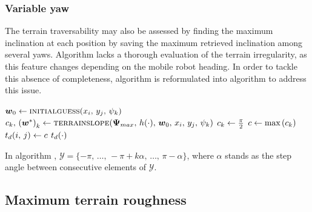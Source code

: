 \subsubsection*{Variable yaw}

The terrain traversability may also be assessed by finding the maximum inclination at each position by saving the maximum retrieved inclination among several yaws. Algorithm  lacks a thorough evaluation of the terrain irregularity, as this feature changes depending on the mobile robot heading. In order to tackle this absence of completeness, algorithm  is reformulated into algorithm  to address this issue.

\begin{algorithm}[H]
	\caption{\footnotesize \textsc{MAPSLOPE}}\label{alg:slopeMinHeightMapVarYaw}
	\centering
	\footnotesize
	\begin{algorithmic}[1]
	 
	\State $\boldsymbol{w}_0 \gets \textsc{initialguess}(x_i, \, y_j, \, \psi_k)$ 
	\State $c_k,\, \left( \boldsymbol{w}^* \right)_k \gets \textsc{terrainslope}(\boldsymbol{\Psi}_{max}, \, h(\cdot), \, \boldsymbol{w}_0, \, x_i, \, y_j, \, \psi_k)$ 
	\Else
	\State $c_k \gets \frac{\pi}{2}$
	\EndIf
	\EndFor
	\State $c \gets \text{max}\left( c_k \right)$ 
	\State $t_d(i,\, j) \gets c$ 
	\EndFor
	\State \Return $t_d(\cdot)$
	\EndFunction
	\end{algorithmic}
\end{algorithm}

In algorithm , $\mathcal{Y} = \lbrace -\pi,\, \ldots,\, -\pi + k \alpha, \, \ldots, \, \pi - \alpha \rbrace$, where $\alpha$ stands as the step angle between consecutive elements of $\mathcal{Y}$.

\subsection{Maximum terrain roughness}
\label{subsection:maxTerrainRoughness}

